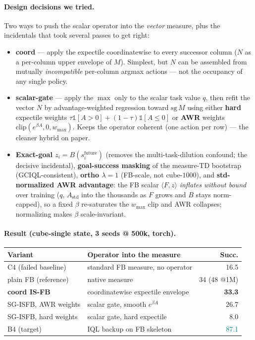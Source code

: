 \documentclass[11pt]{article}
\newcommand{\B}[1]{\textbf{#1}}
\newcommand{\good}[1]{\textcolor{teal}{#1}}
\newcommand{\bad}[1]{\textcolor{red!70!black}{#1}}
\begin{document}
\paragraph{Design decisions we tried.} Two ways to push the scalar operator into the
\emph{vector} measure, plus the incidentals that took several passes to get right:
\begin{itemize}[nosep,leftmargin=1.4em]
\item \B{coord} --- apply the expectile coordinatewise to every successor column
  ($N$ as a per-column upper envelope of $M$). Simplest, but $N$ can be assembled
  from mutually \emph{incompatible} per-column argmax actions --- not the occupancy
  of any single policy.
\item \B{scalar-gate} --- apply the $\max$ only to the scalar task value $q$, then
  refit the vector $N$ by advantage-weighted regression toward $\mathrm{sg}\,M$
  using either \B{hard} expectile weights $\tau\mathbb 1[A{>}0]{+}(1{-}\tau)\mathbb
  1[A{\le}0]$ or \B{AWR} weights $\mathrm{clip}(e^{\beta A},0,w_{\max})$. Keeps the
  operator coherent (one action per row) --- the cleaner hybrid on paper.
\item \B{Exact-goal $z_i{=}B(s_i^{\text{future}})$} (removes the multi-task-dilution
  confound; the decisive incidental), \B{goal-success masking} of the measure-TD
  bootstrap (GCIQL-consistent), \B{ortho $\lambda{=}1$} (FB-scale, not cube-$1000$),
  and \B{std-normalized AWR advantage}: the FB scalar $\langle F,z\rangle$
  \emph{inflates without bound} over training ($q$, $A_{\text{std}}$ into the
  thousands as $F$ grows and $B$ stays norm-capped), so a fixed $\beta$ re-saturates
  the $w_{\max}$ clip and AWR collapses; normalizing makes $\beta$ scale-invariant.
\end{itemize}

\paragraph{Result (cube-single state, 3 seeds @ 500k, torch).}
\begin{center}\small
\begin{tabular}{@{}l l r@{}}
\toprule
Variant & Operator into the measure & Succ. \\
\midrule
C4 (failed baseline)        & standard FB measure, no operator         & \bad{16.5} \\
plain FB (reference)        & native measure                           & 34 (48 @1M) \\
\B{coord IS-FB}             & coordinatewise expectile envelope        & \B{33.3} \\
SG-ISFB, AWR weights        & scalar gate, smooth $e^{\beta A}$        & 26.7 \\
SG-ISFB, hard weights       & scalar gate, hard expectile              & \bad{8.0} \\
B4 (target)                 & IQL backup on FB skeleton                & \good{87.1} \\
\bottomrule
\end{tabular}
\end{center}
\end{document}
